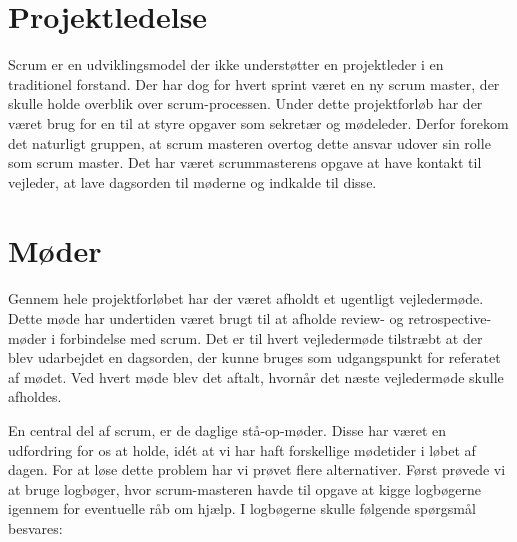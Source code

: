 \section{Projektledelse}
Scrum er en udviklingsmodel der ikke understøtter en projektleder i en traditionel forstand. Der har dog for hvert sprint været en ny scrum master, der skulle holde overblik over scrum-processen. Under dette projektforløb har der været brug for en til at styre opgaver som sekretær og mødeleder. Derfor forekom det naturligt gruppen, at scrum masteren overtog dette ansvar udover sin rolle som scrum master. Det har været scrummasterens opgave at have kontakt til vejleder, at lave dagsorden til møderne og indkalde til disse.  

\section{Møder}
Gennem hele projektforløbet har der været afholdt et ugentligt vejledermøde. Dette møde har undertiden været brugt til at afholde review- og retrospective-møder i forbindelse med scrum. Det er til hvert vejledermøde tilstræbt at der blev udarbejdet en dagsorden, der kunne bruges som udgangspunkt for referatet af mødet. Ved hvert møde blev det aftalt, hvornår det næste vejledermøde skulle afholdes. 


En central del af scrum, er de daglige stå-op-møder. Disse har været en udfordring for os at holde, idét at vi har haft forskellige mødetider i løbet af dagen. For at løse dette problem har vi prøvet flere alternativer. Først prøvede vi at bruge logbøger, hvor scrum-masteren havde til opgave at kigge logbøgerne igennem for eventuelle råb om hjælp. I logbøgerne skulle følgende spørgsmål besvares:

